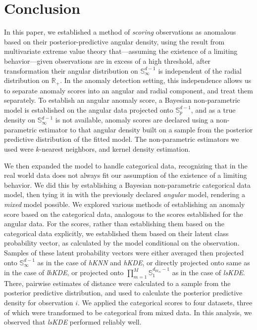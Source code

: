 \section{Conclusion\label{sec:conclusion}}
In this paper, we established a method of \emph{scoring} observations as 
    anomalous based on their posterior-predictive angular density, using the 
    result from multivariate extreme value theory that---assuming the existence 
    of a limiting behavior---given observations are in excess of a high 
    threshold, after transformation their angular distribution on 
    $\mathbb{S}_{\infty}^{d-1}$ is independent of the radial distribution on 
    $\mathbb{R}_+$.  In the anomaly detection setting, this independence allows
    us to separate anomaly scores into an angular and radial component, and
    treat them separately.  To establish an angular anomaly score, a Bayesian 
    non-parametric model is established on the angular data projected onto 
    $\mathbb{S}_p^{d-1}$, and as a true density on $\mathbb{S}_{\infty}^{d-1}$ 
    is not available, anomaly scores are declared using a non-parametric 
    estimator to that angular density built on a sample from the posterior 
    predictive distribution of the fitted model.  The non-parametric estimators 
    we used were $k$-nearest neighbors, and kernel density estimation.

We then expanded the model to handle categorical data, recognizing that in the 
    real world data does not always fit our assumption of the existence of a 
    limiting behavior.  We did this by establishing a Bayesian non-parametric 
    categorical data model, then tying it in with the previously declared 
    \emph{angular} model, rendering a \emph{mixed} model possible.  We explored 
    various methods of establishing an anomaly score based on the categorical 
    data, analogous to the scores established for the angular data.  For the 
    scores, rather than establishing them based on the categorical data 
    explicitly, we established them based on their latent class probability 
    vector, as calculated by the model conditional on the observation. Samples 
    of these latent probability vectors were either averaged then projected onto
    $\mathbb{S}_{\infty}^{d-1}$ as in the case of \emph{hKNN} and \emph{hKDE}, 
    or directly projected onto same as in the case of \emph{lhKDE}, or 
    projected onto    $\prod_{m = 1}^M\mathbb{S}_1^{d_{W_m}-1}$ as in the case 
    of \emph{lsKDE}.  There, pairwise estimates of distance were calculated to 
    a sample from the posterior predictive distribution, and used to calculate 
    the posterior predictive density for observation $i$. We applied the 
    categorical scores to four datasets, three of which were transformed to be 
    categorical from mixed data.  In this analysis, we observed that 
    \emph{lsKDE} performed reliably well.


